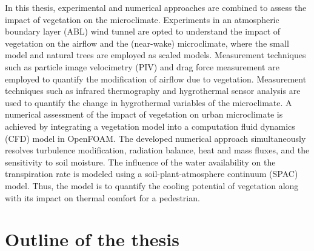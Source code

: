 In this thesis, experimental and numerical approaches are combined to assess the impact of vegetation on the microclimate. Experiments in an atmospheric boundary layer (ABL) wind tunnel are opted to understand the impact of vegetation on the airflow and the (near-wake) microclimate, where the small model and natural trees are employed as scaled models. Measurement techniques such as particle image velocimetry (PIV) and drag force measurement are employed to quantify the modification of airflow due to vegetation. Measurement techniques such as infrared thermography and hygrothermal sensor analysis are used to quantify the change in hygrothermal variables of the microclimate. A numerical assessment of the impact of vegetation on urban microclimate is achieved by integrating a vegetation model into a computation fluid dynamics (CFD) model in OpenFOAM. The developed numerical approach simultaneously resolves turbulence modification, radiation balance, heat and mass fluxes, and the sensitivity to soil moisture. The influence of the water availability on the transpiration rate is modeled using a soil-plant-atmosphere continuum (SPAC) model.  Thus, the model is to quantify the cooling potential of vegetation along with its impact on thermal comfort for a pedestrian.


\section{Outline of the thesis}

